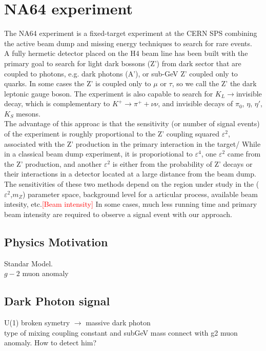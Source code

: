 \section{NA64 experiment} 
The NA64 experiment is a fixed-target experiment at the CERN SPS combining the active beam dump and missing energy
techniques to search for rare events.\\ A fully hermetic detector placed on the H4 beam line has been built with the
primary goal to search for light dark bossons (Z') from dark sector that are coupled to photons, e.g. dark photons (A'),
or sub-GeV Z' coupled only to quarks. In some cases the Z' is coupled only to $\mu$ or $\tau$, so we call the Z' the
dark leptonic gauge boson. The experiment is also capable to search for $K_L \rightarrow $invisible decay, which is
complementary to $K^+\rightarrow \pi^+ + \nu \nu$, and invisible decays of $\pi_0$, $\eta$, $\eta'$, $K_S$ mesons.\\ The
advantage of this approac is that the sensitivity (or number of signal events) of the experiment is roughly proportional
to the Z' coupling squared $\varepsilon^2$, associated with the Z' production in the primary interaction in the target/
While in a classical beam dump experiment, it is proporiotional to $\varepsilon^4$, one $\varepsilon^2$ came from the Z'
production, and another $\varepsilon^2$ is either from the probability of Z' decays or their interactions in a detector
located at a large distance from the beam dump.\\ The sensitivities of these two methods depend on the region under
study in the ($\varepsilon^2$,$m_Z$) parameter space, background level for a articular process, available beam intesity,
etc.\textcolor{red}{[Beam intensity]} In some cases, much less running time and primary beam intensity are required to
observe a signal event with our approach.\par


\subsection{Physics Motivation}
Standar Model.\\
$g-2$ muon anomaly\\

\subsection{Dark Photon signal}
U(1) broken symetry $\longrightarrow$ massive dark photon\\
type of mixing
coupling constant and subGeV mass connect with g2 muon anomaly.
How to detect him?


